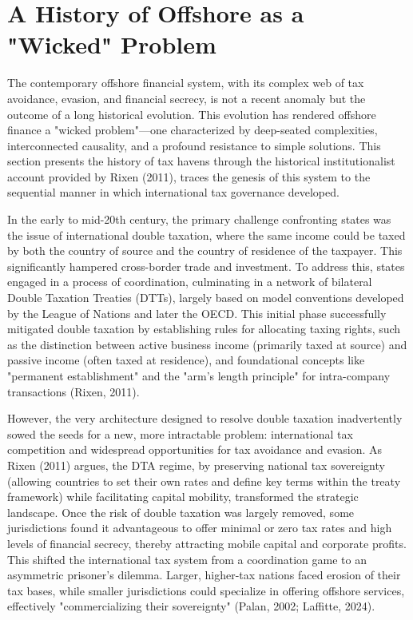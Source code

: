 \section{A History of Offshore as a "Wicked" Problem}
\label{sec:1_2}

The contemporary offshore financial system, with its complex web of tax avoidance, evasion, and financial secrecy, is not a recent anomaly but the outcome of a long historical evolution. This evolution has rendered offshore finance a "wicked problem"—one characterized by deep-seated complexities, interconnected causality, and a profound resistance to simple solutions. This section presents the history of tax havens through the historical institutionalist account provided by Rixen (2011), traces the genesis of this system to the sequential manner in which international tax governance developed.

In the early to mid-20th century, the primary challenge confronting states was the issue of international double taxation, where the same income could be taxed by both the country of source and the country of residence of the taxpayer. This significantly hampered cross-border trade and investment. To address this, states engaged in a process of coordination, culminating in a network of bilateral Double Taxation Treaties (DTTs), largely based on model conventions developed by the League of Nations and later the OECD. This initial phase successfully mitigated double taxation by establishing rules for allocating taxing rights, such as the distinction between active business income (primarily taxed at source) and passive income (often taxed at residence), and foundational concepts like "permanent establishment" and the "arm's length principle" for intra-company transactions (Rixen, 2011).

However, the very architecture designed to resolve double taxation inadvertently sowed the seeds for a new, more intractable problem: international tax competition and widespread opportunities for tax avoidance and evasion. As Rixen (2011) argues, the DTA regime, by preserving national tax sovereignty (allowing countries to set their own rates and define key terms within the treaty framework) while facilitating capital mobility, transformed the strategic landscape. Once the risk of double taxation was largely removed, some jurisdictions found it advantageous to offer minimal or zero tax rates and high levels of financial secrecy, thereby attracting mobile capital and corporate profits. This shifted the international tax system from a coordination game to an asymmetric prisoner's dilemma. Larger, higher-tax nations faced erosion of their tax bases, while smaller jurisdictions could specialize in offering offshore services, effectively "commercializing their sovereignty" (Palan, 2002; Laffitte, 2024).

